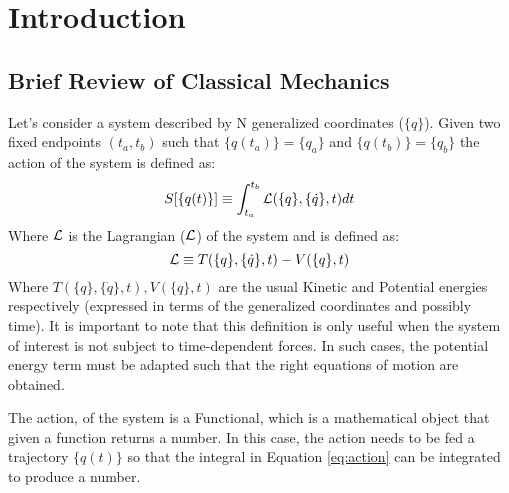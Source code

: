\pagestyle{plain} 
\setcounter{page}{1}

\chapter{Introduction}


\section{Brief Review of Classical Mechanics}
Let's consider a system described by N generalized coordinates ($\{q\}$). Given two fixed endpoints $(t_a,t_b)$ such that $\{q(t_a)\}= \{q_a\}$ and $\{q(t_b)\} = \{q_b\}$ the action of the system is defined as:
\begin{equation}
    S[\{q(t)\}] \equiv \int_{t_a}^{t_b} \mathcal{L}(\{q\},\{\dot q\},t) dt
    \label{eq:action}
\end{equation}
Where $\mathcal{L}$ is the Lagrangian ($\mathcal{L}$) of the system and is defined as:
\begin{equation}
    \mathcal{L} \equiv T(\{q\},\{\dot q\},t) - V(\{q\},t)
\end{equation}
Where $T(\{q\},\{\dot q\},t), V(\{q\},t)$ are the usual Kinetic and Potential energies respectively (expressed in terms of the generalized coordinates and possibly time). It is important to note that this definition is only useful when the system of interest is not subject to time-dependent forces. In such cases, the potential energy term must be adapted such that the right equations of motion are obtained.

\vspace{1mm}\noindent
The action, of the system is a Functional, which is a mathematical object that given a function returns a number. In this case, the action needs to be fed a trajectory $\{q(t)\}$ so that the integral in Equation \ref{eq:action} can be integrated to produce a number.

